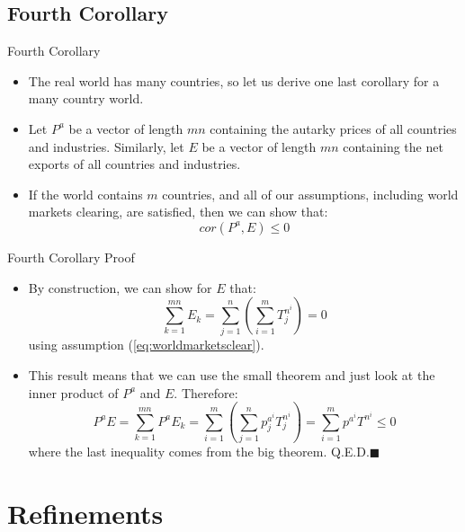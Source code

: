 \documentclass[aspectratio=169]{beamer}
\begin{document}

\subsection{Fourth Corollary}


\begin{frame}{Fourth Corollary}

\begin{itemize}
    \item<1-> The real world has many countries, so let us derive one last corollary for a many country world.
    \item<2-> Let $ P^a $ be a vector of length $ mn $ containing the autarky prices of all countries and industries.  Similarly, let $ E $ be a vector of length $ mn $ containing the net exports of all countries and industries.
    \item<3-> If the world contains $ m $ countries, and all of our assumptions, including world markets clearing, are satisfied, then we can show that:
    \begin{equation*}
        cor\left( P^{a}, E \right) \le 0
    \end{equation*}
\end{itemize}
    
\end{frame}


\begin{frame}{Fourth Corollary Proof}

\begin{itemize}
    \item<1-> By construction, we can show for $ E $ that:
    \begin{equation*}
        \sum_{k=1}^{mn}{E_{k}} = \sum_{j=1}^{n}{\left( \sum_{i=1}^{m}{T_{j}^{n^{i}}} \right)} = 0
    \end{equation*}
    using assumption (\ref{eq:worldmarketsclear}).
    \item<2-> This result means that we can use the small theorem and just look at the inner product of $ P^a $ and $ E $.  Therefore:
    \begin{equation*}
        P^{a} E = \sum_{k=1}^{mn}{P^{a} E_{k}} = \sum_{i=1}^{m}{\left( \sum_{j=1}^{n}{p_{j}^{a^{i}} T_{j}^{n^{i}}} \right)} = \sum_{i=1}^{m}{p^{a^{i}} T^{n^{i}}} \le 0
    \end{equation*}
    where the last inequality comes from the big theorem.  Q.E.D.$ \blacksquare $
\end{itemize}
    
\end{frame}


\section{Refinements}

\end{document}
